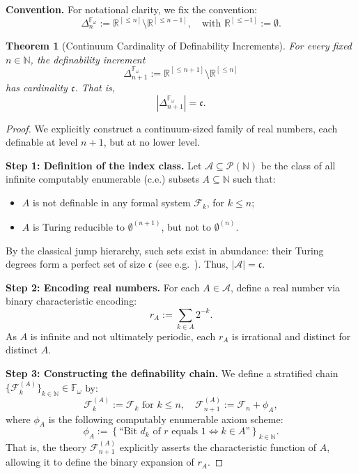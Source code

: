\documentclass[12pt]{article}
\theoremstyle{definition}
\theoremstyle{plain}
\newtheorem{theorem}[definition]{Theorem}
\theoremstyle{remark}
\begin{document}
\noindent\textbf{Convention.}
For notational clarity, we fix the convention:
\[
\Delta_n^{\mathbb{F}_\omega} := \mathbb{R}^{[\leq n]} \setminus \mathbb{R}^{[\leq n-1]}, \quad \text{with } \mathbb{R}^{[\leq -1]} := \emptyset.
\]

\begin{theorem}[Continuum Cardinality of Definability Increments]
\label{thm:delta-n-continuum}
For every fixed \( n \in \mathbb{N} \), the definability increment
\[
\Delta_{n+1}^{\mathbb{F}_\omega} := \mathbb{R}^{[\leq n+1]} \setminus \mathbb{R}^{[\leq n]}
\]
has cardinality \( \mathfrak{c} \). That is,
\[
\left| \Delta_{n+1}^{\mathbb{F}_\omega} \right| = \mathfrak{c}.
\]
\end{theorem}

\begin{proof}
We explicitly construct a continuum-sized family of real numbers, each definable at level \( n+1 \), but at no lower level.

\textbf{Step 1: Definition of the index class.}  
Let \( \mathcal{A} \subseteq \mathcal{P}(\mathbb{N}) \) be the class of all infinite computably enumerable (c.e.) subsets \( A \subseteq \mathbb{N} \) such that:
\begin{itemize}
    \item \( A \) is not definable in any formal system \( \mathcal{F}_k \), for \( k \leq n \);
    \item \( A \) is Turing reducible to \( \emptyset^{(n+1)} \), but not to \( \emptyset^{(n)} \).
\end{itemize}

By the classical jump hierarchy, such sets exist in abundance: their Turing degrees form a perfect set of size \( \mathfrak{c} \) (see e.g.\ \cite{Simpson2009Subsystems}). Thus, \( |\mathcal{A}| = \mathfrak{c} \).

\textbf{Step 2: Encoding real numbers.}  
For each \( A \in \mathcal{A} \), define a real number via binary characteristic encoding:
\[
r_A := \sum_{k \in A} 2^{-k}.
\]
As \( A \) is infinite and not ultimately periodic, each \( r_A \) is irrational and distinct for distinct \( A \).

\textbf{Step 3: Constructing the definability chain.}  
We define a stratified chain \( \{ \mathcal{F}_k^{(A)} \}_{k \in \mathbb{N}} \in \mathbb{F}_\omega \) by:
\[
\mathcal{F}_k^{(A)} := \mathcal{F}_k \text{ for } k \leq n, \quad
\mathcal{F}_{n+1}^{(A)} := \mathcal{F}_n + \phi_A,
\]
where \( \phi_A \) is the following computably enumerable axiom scheme:
\[
\phi_A := \left\{ \text{``Bit } d_k \text{ of } r \text{ equals } 1 \iff k \in A \text{''} \right\}_{k \in \mathbb{N}}.
\]
That is, the theory \( \mathcal{F}_{n+1}^{(A)} \) explicitly asserts the characteristic function of \( A \), allowing it to define the binary expansion of \( r_A \).


\end{proof}
\end{document}
